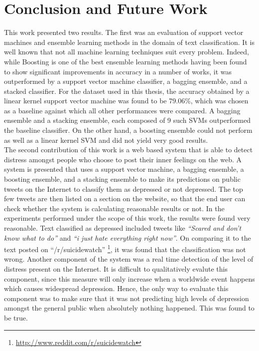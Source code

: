 \chapter{Conclusion and Future Work}
\label{chapter:Conclusion}

This work presented two results. The first was an evaluation of support vector machines and ensemble learning methods in the domain of text classification. It is well known that not all machine learning techniques suit every problem. Indeed, while Boosting is one of the best ensemble learning methods having been found to show significant improvements in accuracy in a number of works, it was outperformed by a support vector machine classifier, a bagging ensemble, and a stacked classifier. For the dataset used in this thesis, the accuracy obtained by a linear kernel support vector machine was found to be 79.06\%, which was chosen as a baseline against which all other performances were compared. A bagging ensemble and a stacking ensemble, each composed of 9 such SVMs outperformed the baseline classifier. On the other hand, a boosting ensemble could not perform as well as a linear kernel SVM and did not yield very good results.\\

The second contribution of this work is a web based system that is able to detect distress amongst people who choose to post their inner feelings on the web. A system is presented that uses a support vector machine, a bagging ensemble, a boosting ensemble, and a stacking ensemble to make its predictions on public tweets on the Internet to classify them as depressed or not depressed. The top few tweets are then listed on a section on the website, so that the end user can check whether the system is calculating reasonable results or not. In the experiments performed under the scope of this work, the results were found very reasonable. Text classified as depressed included tweets like \emph{``Scared and don't know what to do''} and \emph{``i just hate everything right now''}. On comparing it to the text posted on ``/r/suicidewatch'' \footnote{\url{http://www.reddit.com/r/suicidewatch}}, it was found that the classification was not wrong. Another component of the system was a real time detection of the level of distress present on the Internet. It is difficult to qualitatively evalute this component, since this measure will only increase when a worldwide event happens which causes widespread depression. Hence, the only way to evaluate this component was to make sure that it was not predicting high levels of depression amongst the general public when absolutely nothing happened. This was found to be true.\\

